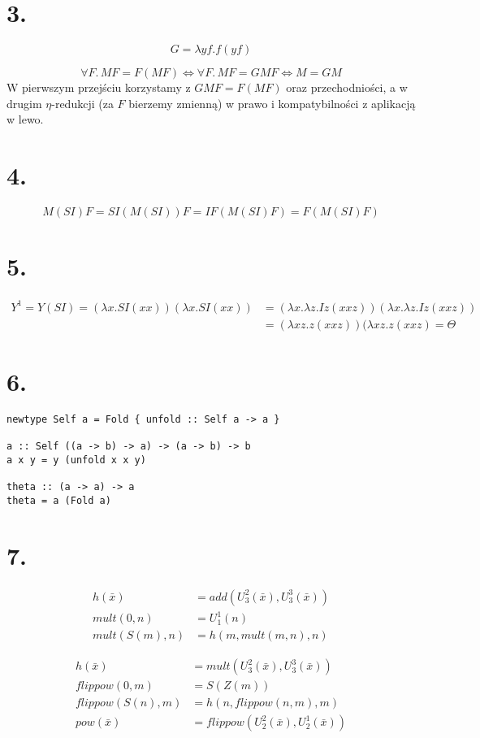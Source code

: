 \documentclass[a4paper, 12pt]{article}
\newcommand{\+}{\enspace}
\begin{document}
\section*{3.}
$$G=λyf.f(yf)$$

$$∀F.\,MF=F(MF) \iff ∀F.\,MF=GMF \iff M=GM$$
W pierwszym przejściu korzystamy z $GMF=F(MF)$ oraz przechodniości,
a w drugim $η$-redukcji (za $F$ bierzemy zmienną) w prawo i kompatybilności z aplikacją w lewo.

\section*{4.}
$$M(SI)F=SI(M(SI))F=IF(M(SI)F)=F(M(SI)F)$$

\section*{5.}
\begin{align*}
	Y^1 = Y(SI) = (λx.SI(xx))(λx.SI(xx)) &= (λx.λz.Iz(xxz))(λx.λz.Iz(xxz)) \\ &= (λxz.z(xxz))(λxz.z(xxz) = Θ
\end{align*}

\section*{6.}
\begin{lstlisting}
newtype Self a = Fold { unfold :: Self a -> a }

a :: Self ((a -> b) -> a) -> (a -> b) -> b
a x y = y (unfold x x y)

theta :: (a -> a) -> a
theta = a (Fold a)
\end{lstlisting}

\section*{7.}
\begin{align*}
	h(\bar{x}) &= add(U^2_3(\bar x), U^3_3(\bar x)) \\
	mult(0,n) &= U^1_1(n) \\
	mult(S(m), n) &= h(m, mult(m, n), n)
\end{align*}

\begin{align*}
	h(\bar{x}) &= mult(U^2_3(\bar x), U^3_3(\bar x)) \\
	flippow(0,m) &= S(Z(m)) \\
	flippow(S(n), m) &= h(n, flippow(n, m), m) \\
	pow(\bar{x}) &= flippow(U^2_2(\bar{x}), U^1_2(\bar{x}))
\end{align*}
\end{document}
